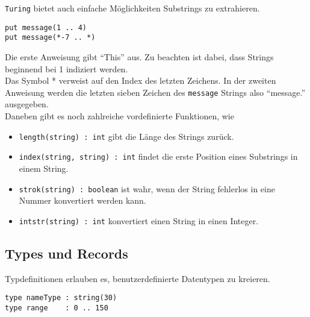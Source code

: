 \texttt{Turing} bietet auch einfache M\"oglichkeiten Substrings zu extrahieren. 

\lstset{label=LIS:str:sub}
\begin{table}[h!]
\begin{lstlisting}
put message(1 .. 4)
put message(*-7 .. *)
\end{lstlisting}
\end{table}

Die erste Anweisung gibt ``This'' aus. Zu beachten ist dabei, dass Strings beginnend bei 1 indiziert werden. \\
Das Symbol * verweist auf den Index des letzten Zeichens. In der zweiten Anweisung werden die letzten sieben Zeichen des \texttt{message} Strings also ``message.'' ausgegeben. \\

Daneben gibt es noch zahlreiche vordefinierte Funktionen, wie 

\begin{itemize}
   \item \lstinline{length(string) : int} gibt die L\"ange des Strings zur\"uck.
   \item \lstinline{index(string, string) : int} findet die erste Position eines Substrings in einem String.
   \item \lstinline{strok(string) : boolean} ist wahr, wenn der String fehlerlos in eine Nummer konvertiert werden kann.
   \item \lstinline{intstr(string) : int} konvertiert einen String in einen Integer.
\end{itemize}

\subsection{Types und Records}

Typdefinitionen erlauben es, benutzerdefinierte Datentypen zu kreieren. 

\lstset{label=LIS:type}
\begin{table}[!h]
\begin{lstlisting}
type nameType : string(30)
type range    : 0 .. 150
\end{lstlisting}
\end{table}

